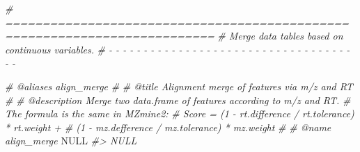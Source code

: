 \documentclass[
]{article}
\newenvironment{Shaded}{\begin{snugshade}}{\end{snugshade}}
\newcommand{\CommentTok}[1]{\textcolor[rgb]{0.56,0.35,0.01}{\textit{#1}}}
\newcommand{\ConstantTok}[1]{\textcolor[rgb]{0.00,0.00,0.00}{#1}}
\begin{document}
\begin{Shaded}
\begin{Highlighting}[]
\CommentTok{\# ==========================================================================}
\CommentTok{\# Merge data tables based on continuous variables.}
\CommentTok{\# {-} {-} {-} {-} {-} {-} {-} {-} {-} {-} {-} {-} {-} {-} {-} {-} {-} {-} {-} {-} {-} {-} {-} {-} {-} {-} {-} {-} {-} {-} {-} {-} {-} {-} {-} {-} {-}}

\CommentTok{\#\textquotesingle{} @aliases align\_merge}
\CommentTok{\#\textquotesingle{}}
\CommentTok{\#\textquotesingle{} @title Alignment merge of \textquotesingle{}features\textquotesingle{} via m/z and RT}
\CommentTok{\#\textquotesingle{}}
\CommentTok{\#\textquotesingle{} @description Merge two data.frame of \textquotesingle{}features\textquotesingle{} according to m/z and RT.}
\CommentTok{\#\textquotesingle{} The formula is the same in MZmine2:}
\CommentTok{\#\textquotesingle{} Score = (1 {-} rt.difference / rt.tolerance) * rt.weight +}
\CommentTok{\#\textquotesingle{} (1 {-} mz.defference / mz.tolerance) * mz.weight}
\CommentTok{\#\textquotesingle{}}
\CommentTok{\#\textquotesingle{} @name align\_merge}
\ConstantTok{NULL}
\CommentTok{\#\textgreater{} NULL}


\end{Highlighting}
\end{Shaded}
\end{document}
